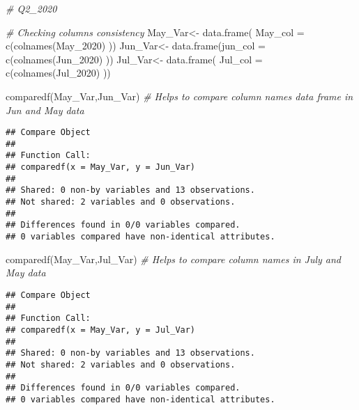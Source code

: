 \documentclass[
]{article}
\newenvironment{Shaded}{\begin{snugshade}}{\end{snugshade}}
\newcommand{\AttributeTok}[1]{\textcolor[rgb]{0.77,0.63,0.00}{#1}}
\newcommand{\CommentTok}[1]{\textcolor[rgb]{0.56,0.35,0.01}{\textit{#1}}}
\newcommand{\FunctionTok}[1]{\textcolor[rgb]{0.00,0.00,0.00}{#1}}
\newcommand{\NormalTok}[1]{#1}
\newcommand{\OtherTok}[1]{\textcolor[rgb]{0.56,0.35,0.01}{#1}}
\begin{document}
\begin{Shaded}
\begin{Highlighting}[]
\CommentTok{\# Q2\_2020 }
\end{Highlighting}
\end{Shaded}

\begin{Shaded}
\begin{Highlighting}[]
\CommentTok{\# Checking columns consistency }
\NormalTok{ May\_Var}\OtherTok{\textless{}{-}} \FunctionTok{data.frame}\NormalTok{( }\AttributeTok{May\_col =} \FunctionTok{c}\NormalTok{(}\FunctionTok{colnames}\NormalTok{(May\_2020) ))}
\NormalTok{ Jun\_Var}\OtherTok{\textless{}{-}} \FunctionTok{data.frame}\NormalTok{(}\AttributeTok{jun\_col =}  \FunctionTok{c}\NormalTok{(}\FunctionTok{colnames}\NormalTok{(Jun\_2020) ))}
\NormalTok{ Jul\_Var}\OtherTok{\textless{}{-}} \FunctionTok{data.frame}\NormalTok{( }\AttributeTok{Jul\_col =}  \FunctionTok{c}\NormalTok{(}\FunctionTok{colnames}\NormalTok{(Jul\_2020) ))}
 
 \FunctionTok{comparedf}\NormalTok{(May\_Var,Jun\_Var) }\CommentTok{\# Helps to compare column names data frame in Jun and May data}
\end{Highlighting}
\end{Shaded}

\begin{verbatim}
## Compare Object
## 
## Function Call: 
## comparedf(x = May_Var, y = Jun_Var)
## 
## Shared: 0 non-by variables and 13 observations.
## Not shared: 2 variables and 0 observations.
## 
## Differences found in 0/0 variables compared.
## 0 variables compared have non-identical attributes.
\end{verbatim}

\begin{Shaded}
\begin{Highlighting}[]
 \FunctionTok{comparedf}\NormalTok{(May\_Var,Jul\_Var) }\CommentTok{\# Helps to compare column names in July and May data}
\end{Highlighting}
\end{Shaded}

\begin{verbatim}
## Compare Object
## 
## Function Call: 
## comparedf(x = May_Var, y = Jul_Var)
## 
## Shared: 0 non-by variables and 13 observations.
## Not shared: 2 variables and 0 observations.
## 
## Differences found in 0/0 variables compared.
## 0 variables compared have non-identical attributes.
\end{verbatim}
\end{document}
